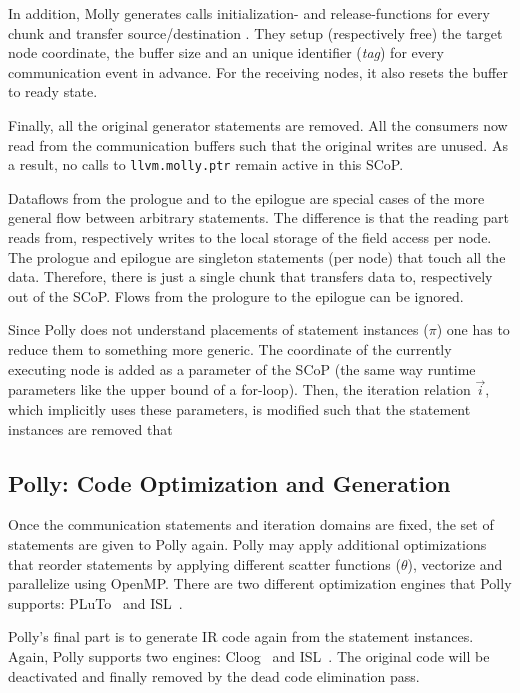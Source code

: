 \documentclass{sigplanconf}
\begin{document}
In addition, Molly generates calls initialization- and release-functions for every chunk and transfer source/destination 
. They setup (respectively free) the target node coordinate, the buffer size and an unique identifier (\emph{tag}) for every communication event in advance. For the receiving nodes, it also resets the buffer to ready state.


Finally, all the original generator statements are removed. All the consumers now read from the communication buffers such that the original writes are unused. As a result, no calls to \texttt{llvm.molly.ptr} remain active in this SCoP.


Dataflows from the prologue and to the epilogue are special cases of the more general flow between arbitrary statements. The difference is that the reading part reads from, respectively writes to the local storage of the field access per node. The prologue and epilogue are singleton statements (per node) that touch all the data. Therefore, there is just a single chunk that transfers data to, respectively out of the SCoP. Flows from the prologure to the epilogue can be ignored.



Since Polly does not understand placements of statement instances ($\pi$) one has to reduce them to something more generic. The coordinate of the currently executing node is added as a parameter of the SCoP (the same way runtime parameters like the upper bound of a for-loop). Then, the iteration relation $\vec i$, which implicitly uses these parameters, is modified such that the statement instances are removed that 






\subsection{Polly: Code Optimization and Generation}

Once the communication statements and iteration domains are fixed, the set of statements are given to Polly again. Polly may apply additional optimizations that reorder statements by applying different scatter functions ($\theta$), vectorize and parallelize using OpenMP. There are two different optimization engines that Polly supports: PLuTo~\cite{pluto} and ISL~\cite{isl}.

Polly's final part is to generate IR code again from the statement instances. Again, Polly supports two engines: Cloog~\cite{cloog} and ISL~\cite{isl}.  The original code will be deactivated and finally removed by the dead code elimination pass.
\end{document}
